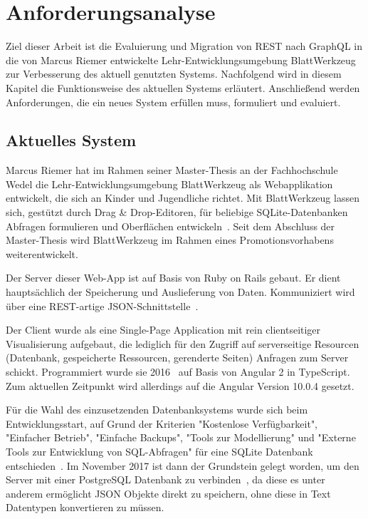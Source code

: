 
\chapter{Anforderungsanalyse}
\label{sec:requirements}

Ziel dieser Arbeit ist die Evaluierung und Migration von REST nach GraphQL in die von Marcus Riemer entwickelte Lehr-Entwicklungsumgebung BlattWerkzeug zur Verbesserung des aktuell genutzten Systems.
Nachfolgend wird in diesem Kapitel die Funktionsweise des aktuellen Systems erläutert. 
Anschließend werden Anforderungen, die ein neues System erfüllen muss, formuliert und evaluiert.

\section{Aktuelles System}
\label{sec:requirements:system}

Marcus Riemer hat im Rahmen seiner Master-Thesis an der Fachhochschule Wedel die Lehr-Entwicklungsumgebung BlattWerkzeug als Webapplikation entwickelt,
die sich an Kinder und Jugendliche richtet. Mit BlattWerkzeug lassen sich, gestützt durch Drag \& Drop-Edi\-toren,
für beliebige SQLite-Datenbanken Abfragen formulieren und Oberflächen entwickeln~\cite[2]{riemer2016}.
Seit dem Abschluss der Master-Thesis wird BlattWerkzeug im Rahmen eines Promotionsvorhabens weiterentwickelt.

Der Server dieser Web-App ist auf Basis von Ruby on Rails gebaut. Er dient hauptsächlich der Speicherung und Auslieferung von Daten.
Kommuniziert wird über eine REST-artige JSON-Schnittstelle~\cite[94]{riemer2016}.

Der Client wurde als eine Single-Page Application mit rein clientseitiger Visualisierung aufgebaut,
die lediglich für den Zugriff auf serverseitige Resourcen  (Datenbank, gespeicherte Ressourcen, gerenderte Seiten) Anfragen zum Server schickt.
Programmiert wurde sie 2016~\cite[1]{riemer2016} auf Basis von Angular 2 in TypeScript.
Zum aktuellen Zeitpunkt wird allerdings auf die Angular Version 10.0.4 gesetzt.

Für die Wahl des einzusetzenden Datenbanksystems wurde sich beim Entwicklungsstart, auf Grund der Kriterien "Kostenlose Verfügbarkeit",
"Einfacher Betrieb", "Einfache Backups", "Tools zur Modellierung" und "Externe Tools zur Entwicklung von SQL-Abfragen"
für eine SQLite Datenbank entschieden~\cite[99-100]{riemer2016}. Im November 2017 ist dann der Grundstein gelegt worden,
um den Server mit einer PostgreSQL Datenbank zu verbinden~\cite{riemerPostgresCommit}, da diese es unter anderem ermöglicht JSON Objekte direkt zu speichern,
ohne diese in Text Datentypen konvertieren zu müssen.

